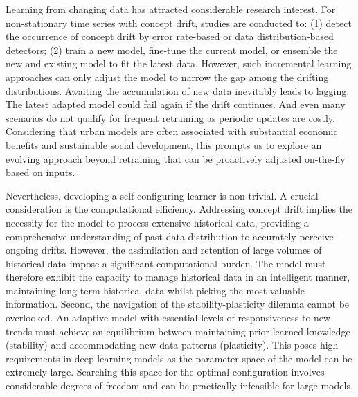 \documentclass[sigconf]{acmart}
\begin{document}
Learning from changing data has attracted considerable research interest. For non-stationary time series with concept drift, studies are conducted to: (1) detect the occurrence of concept drift by error rate-based \cite{gama2004learning,bifet2007learning} or data distribution-based \cite{kifer2004detecting,bhatia2022memstream} detectors; (2) train a new model, fine-tune the current model, or ensemble the new and existing model \cite{li2022ddg,du2021adarnn,you2021learning} to fit the latest data. However, such incremental learning approaches can only adjust the model to narrow the gap among the drifting distributions. Awaiting the accumulation of new data inevitably leads to lagging. The latest adapted model could fail again if the drift continues. And even many scenarios do not qualify for frequent retraining as periodic updates are costly. Considering that urban models are often associated with substantial economic benefits and sustainable social development, this prompts us to explore an evolving approach beyond retraining that can be proactively adjusted on-the-fly based on inputs.

Nevertheless, developing a self-configuring learner is non-trivial. A crucial consideration is the computational efficiency. Addressing concept drift implies the necessity for the model to process extensive historical data, providing a comprehensive understanding of past data distribution to accurately perceive ongoing drifts. However, the assimilation and retention of large volumes of historical data impose a significant computational burden. The model must therefore exhibit the capacity to manage historical data in an intelligent manner, maintaining long-term historical data whilst picking the most valuable information. Second, the navigation of the stability-plasticity dilemma cannot be overlooked. An adaptive model with essential levels of responsiveness to new trends must achieve an equilibrium between maintaining prior learned knowledge (stability) and accommodating new data patterns (plasticity). This poses high requirements in deep learning models as the parameter space of the model can be extremely large. Searching this space for the optimal configuration involves considerable degrees of freedom and can be practically infeasible for large models.
\end{document}
